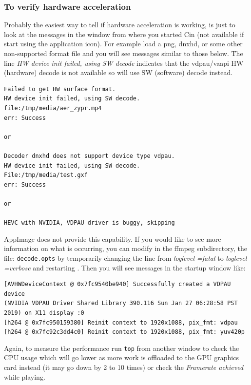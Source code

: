 \subsubsection*{To verify hardware acceleration}%
\label{ssub:verify_hardware_acceleration}

Probably the easiest way to tell if hardware acceleration is working, is just to look at the messages in the window from where you started Cin (not available if start using the application icon).  For example load a png, dnxhd, or some other non-supported format file and you will see messages similar to those below.  The line \textit{HW device init failed, using SW decode} indicates that the vdpau/vaapi HW (hardware) decode is not available so will use SW (software) decode instead.

\begin{lstlisting}[numbers=none]
Failed to get HW surface format.
HW device init failed, using SW decode.
file:/tmp/media/aer_zypr.mp4
err: Success

or

Decoder dnxhd does not support device type vdpau.
HW device init failed, using SW decode.
File:/tmp/media/test.gxf
err: Success

or

HEVC with NVIDIA, VDPAU driver is buggy, skipping
\end{lstlisting}

AppImage does not provide this capability. If you would like to see more information on what is occurring, you can modify in the \CGG{} ffmpeg subdirectory, the file:  \texttt{decode.opts}   by temporarily changing the line from \textit{loglevel =fatal} to \textit{loglevel =verbose} and restarting \CGG{}.  Then you will see messages in the startup window like:

\begin{lstlisting}[numbers=none]
[AVHWDeviceContext @ 0x7fc9540be940] Successfully created a VDPAU device 
(NVIDIA VDPAU Driver Shared Library 390.116 Sun Jan 27 06:28:58 PST 2019) on X11 display :0
[h264 @ 0x7fc950159380] Reinit context to 1920x1088, pix_fmt: vdpau
[h264 @ 0x7fc92c3dd4c0] Reinit context to 1920x1088, pix_fmt: yuv420p
\end{lstlisting}

Again, to measure the performance run \texttt{top} from another window to check the CPU usage which will go lower as more work is offloaded to the GPU graphics card instead (it may go down by 2 to 10 times) or check the \textit{Framerate achieved} while playing.

